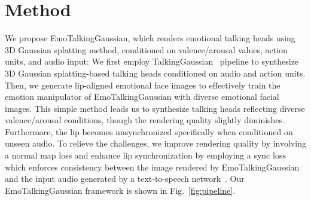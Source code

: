 \section{Method}
\label{sec:method}




We propose EmoTalkingGaussian, which renders emotional talking heads using 3D Gaussian splatting method, conditioned on valence/arousal values, action units, and audio input: We first employ TalkingGaussian~\cite{li2024talkinggaussian} pipeline to synthesize 3D Gaussian splatting-based talking heads conditioned on audio and action units. Then, we generate lip-aligned emotional face images to effectively train the emotion manipulator of EmoTalkingGaussian with diverse emotional facial images. This simple method leads us to synthesize talking heads reflecting diverse valence/arousal conditions, though the rendering quality slightly diminishes. Furthermore, the lip becomes unsynchronized specifically when conditioned on unseen audio. To relieve the challenges, we improve rendering quality by involving a normal map loss and enhance lip synchronization by employing a sync loss which enforces consistency between the image rendered by EmoTalkingGaussian and the input audio generated by a text-to-speech network~\cite{gTTS}. Our EmoTalkingGaussian framework is shown in Fig.~\ref{fig:pipeline}.





